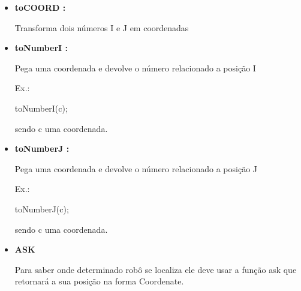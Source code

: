 \documentclass[a4paper]{article}
\begin{document}
{{{{{\begin{itemize}
\begin{enumerate}
                        number square(number x)
                        
                        \{
                        
                        \ \ \ \ my j = x;
                        
                        \ \ \ \ return x*j;
                        
                        \}
                
            \end{enumerate}
            
        \bigskip      
       
        \item \textbf{toCOORD :}
            
            Transforma dois números I e J em coordenadas
        
        \bigskip      
        
        \item \textbf{toNumberI :}
            
            Pega uma coordenada e devolve o número relacionado
            a posição I
            
            \textcolor{NavyBlue}{Ex.:}
            
            toNumberI(c);
            
            sendo c uma coordenada.
            
        \bigskip
        
        \item \textbf{toNumberJ :}
            
            Pega uma coordenada e devolve o número relacionado
            a posição J
            
            \textcolor{NavyBlue}{Ex.:}
            
            toNumberJ(c);
            
            sendo c uma coordenada.
            
       
       
\newpage %
        
         
        \item \textbf{ASK}
        
            Para saber onde determinado robô se localiza
            ele deve usar a função 
            \textcolor{NavyBlue}{ask} 
            que retornará a sua posição na forma
            Coordenate.
        

\end{itemize}}}}}}
\end{document}
